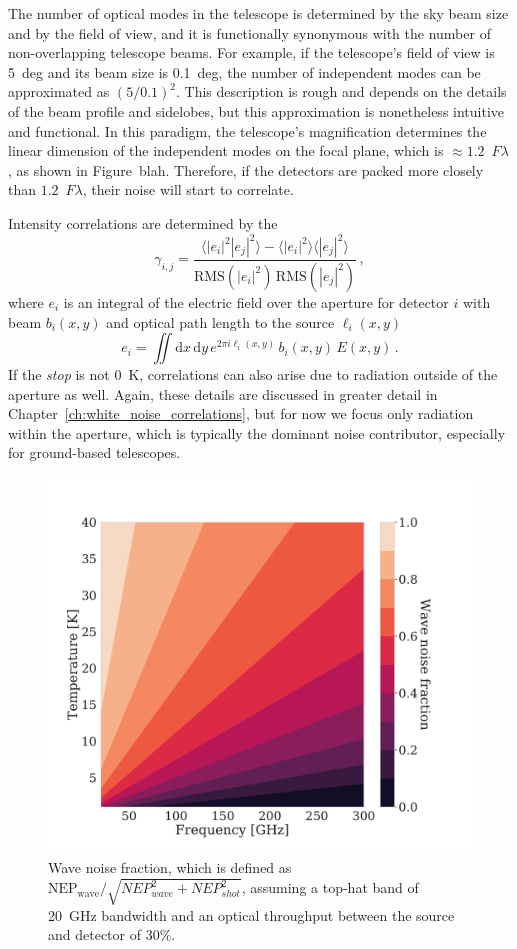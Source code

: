 The number of optical modes in the telescope is determined by the sky beam size and by the field of view, and it is functionally synonymous with the number of non-overlapping telescope beams. For example, if the telescope's field of view is 5~deg and its beam size is 0.1~deg, the number of independent modes can be approximated as $(5 / 0.1)^{2}$. This description is rough and depends on the details of the beam profile and sidelobes, but this approximation is nonetheless intuitive and functional. In this paradigm, the telescope's magnification determines the linear dimension of the independent modes on the focal plane, which is $\approx 1.2$~$F \lambda$, as shown in Figure~blah. Therefore, if the detectors are packed more closely than $1.2$~$F \lambda$, their noise will start to correlate.

Intensity correlations are determined by the 
\begin{equation}
    \gamma_{i,j} = \frac{\langle|e_{i}|^{2}|e_{j}|^{2}\rangle - \langle|e_{i}|^{2}\rangle\langle|e_{j}|^{2}\rangle}{\mathrm{RMS}\left(|e_{i}|^{2}\right) \, \mathrm{RMS}\left(|e_{j}|^{2}\right)} \, ,
\end{equation}
where $e_{i}$ is an integral of the electric field over the aperture for detector $i$ with beam $b_{i}(x,y)$ and optical path length to the source $\ell_{i}(x,y)$ 
\begin{equation}
    e_{i} = \iint \mathrm{d}x \, \mathrm{d}y \, e^{2 \pi i \ell_{i}(x,y)} \, b_{i}(x,y) \, E(x,y) \, .
\end{equation}
If the \textit{stop} is not 0~K, correlations can also arise due to radiation outside of the aperture as well. Again, these details are discussed in greater detail in Chapter~\ref{ch:white_noise_correlations}, but for now we focus only radiation within the aperture, which is typically the dominant noise contributor, especially for ground-based telescopes.

\begin{figure}
    \centering
    \includegraphics[width=0.65\linewidth, trim=1cm 1cm 1cm 3cm, clip]{SensitivityCalculation/Figures/bose_noise_fraction.pdf}
    \caption{Wave noise fraction, which is defined as $\mathrm{NEP_{wave}} / \sqrt{NEP_{wave}^{2} + NEP_{shot}^{2}}$, assuming a top-hat band of 20~GHz bandwidth and an optical throughput between the source and detector of 30\%.}
    \label{fig:bose_noise_fraction}
\end{figure}


